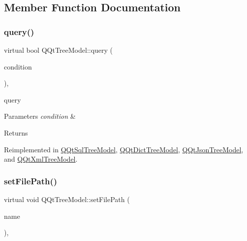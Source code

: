 \subsection{Member Function Documentation}
\mbox{\label{class_q_qt_tree_model_aacd492ce920be939d95d7e1bc2978cb1}} 
\subsubsection{\texorpdfstring{query()}{query()}}
{\footnotesize\ttfamily virtual bool Q\+Qt\+Tree\+Model\+::query (\begin{DoxyParamCaption}\item[{Q\+String}]{condition }\end{DoxyParamCaption})\hspace{0.3cm}{\ttfamily [inline]}, {\ttfamily [virtual]}}



query 


\begin{DoxyParams}{Parameters}
{\em condition} & \\
\hline
\end{DoxyParams}
\begin{DoxyReturn}{Returns}

\end{DoxyReturn}


Reimplemented in \mbox{\hyperlink{class_q_qt_sql_tree_model_a786e05d313e70e50d7103c28dd7a2554}{Q\+Qt\+Sql\+Tree\+Model}}, \mbox{\hyperlink{class_q_qt_dict_tree_model_ada114e06110a8b69d40fc073ff7fea35}{Q\+Qt\+Dict\+Tree\+Model}}, \mbox{\hyperlink{class_q_qt_json_tree_model_a9a26861ebe5884c4c35acd8421f51ed7}{Q\+Qt\+Json\+Tree\+Model}}, and \mbox{\hyperlink{class_q_qt_xml_tree_model_a0b9bb00bcd6605d6c3988b680f3b51fb}{Q\+Qt\+Xml\+Tree\+Model}}.

\mbox{\label{class_q_qt_tree_model_acfeea0d58fa29b1c34c1491f6a8f0b7c}} 
\subsubsection{\texorpdfstring{set\+File\+Path()}{setFilePath()}}
{\footnotesize\ttfamily virtual void Q\+Qt\+Tree\+Model\+::set\+File\+Path (\begin{DoxyParamCaption}\item[{Q\+String}]{name }\end{DoxyParamCaption})\hspace{0.3cm}{\ttfamily [inline]}, {\ttfamily [virtual]}}



